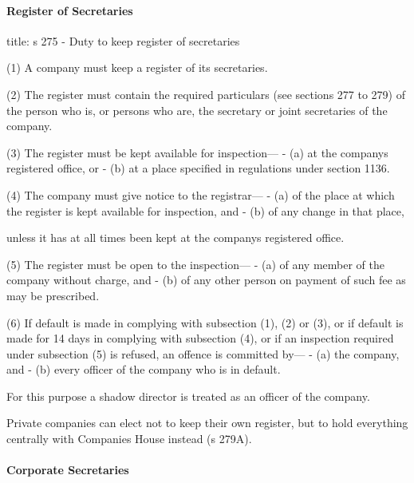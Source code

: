 \documentclass[
]{article}
\newenvironment{Shaded}{}{}
\newcommand{\NormalTok}[1]{#1}
\begin{document}
\hypertarget{register-of-secretaries}{%
\paragraph{Register of Secretaries}\label{register-of-secretaries}}

\begin{Shaded}
\begin{Highlighting}[]
\NormalTok{title: s 275 {-} Duty to keep register of secretaries}

\NormalTok{(1) A company must keep a register of its secretaries.}

\NormalTok{(2) The register must contain the required particulars (see sections 277 to 279) of the person who is, or persons who are, the secretary or joint secretaries of the company.}

\NormalTok{(3) The register must be kept available for inspection—}
\NormalTok{{-} (a) at the company\textquotesingle{}s registered office, or}
\NormalTok{{-} (b) at a place specified in regulations under section 1136.}

\NormalTok{(4) The company must give notice to the registrar—}
\NormalTok{{-} (a) of the place at which the register is kept available for inspection, and}
\NormalTok{{-} (b) of any change in that place,}

\NormalTok{unless it has at all times been kept at the company\textquotesingle{}s registered office.}

\NormalTok{(5) The register must be open to the inspection—}
\NormalTok{{-} (a) of any member of the company without charge, and}
\NormalTok{{-} (b) of any other person on payment of such fee as may be prescribed.}

\NormalTok{(6) If default is made in complying with subsection (1), (2) or (3), or if default is made for 14 days in complying with subsection (4), or if an inspection required under subsection (5) is refused, an offence is committed by—}
\NormalTok{{-} (a) the company, and}
\NormalTok{{-} (b) every officer of the company who is in default.}

\NormalTok{For this purpose a shadow director is treated as an officer of the company. }
\end{Highlighting}
\end{Shaded}

Private companies can elect not to keep their own register, but to hold
everything centrally with Companies House instead (s 279A).

\hypertarget{corporate-secretaries}{%
\paragraph{Corporate Secretaries}\label{corporate-secretaries}}
\end{document}
